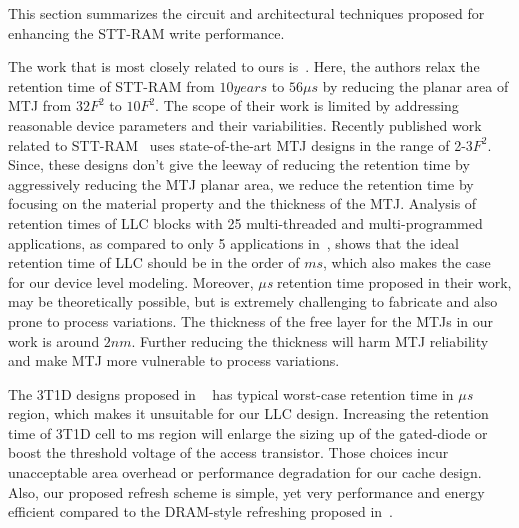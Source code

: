 


This section summarizes the circuit and architectural techniques proposed for enhancing the STT-RAM
write performance.

The work that is most closely related to ours is~\cite{STTRAM:HPCA11}.
Here, the authors relax the retention time of STT-RAM from $10 years$ to $56 \mu s$ by
reducing the planar area of MTJ from $32F^2$ to $10F^2$. The scope of their work is limited by
addressing reasonable device parameters and their variabilities. Recently published work related to
STT-RAM~\cite{PMTJ:Toshiba08,STTRAM:EDL11,STTRAM:Qualcomm09,STTRAM:Grandis11}
uses state-of-the-art MTJ designs in the range of 2-3$F^2$. Since, these designs don't give the
leeway of reducing the retention time by aggressively reducing the MTJ planar area, we reduce the
retention time by focusing on the material property and the thickness of the MTJ.
Analysis of
retention times of LLC blocks with 25 multi-threaded and multi-programmed applications,
as compared to only 5 applications in~\cite{STTRAM:HPCA11}, shows that
the ideal retention time of LLC should be in the order of $ms$, which also makes
the case for our device level modeling. Moreover, {\it $\mu$s} retention time proposed
in their work, may be theoretically possible, but is extremely challenging to
fabricate and also prone to process variations. The thickness of the free layer for the MTJs in our work is around $2nm$. Further reducing the thickness will harm MTJ reliability and make MTJ more vulnerable to process variations.


The 3T1D designs proposed in ~\cite{3T-brooks} has typical worst-case retention time in {\it $\mu$s} region, which makes it unsuitable for our LLC design. Increasing the retention time of 3T1D cell to ms region will enlarge the sizing up of the gated-diode or boost the threshold voltage of the access transistor. Those choices incur unacceptable area overhead or performance degradation for our cache design. Also, our proposed refresh scheme is simple, yet very performance and energy efficient compared to the DRAM-style refreshing proposed in~\cite{STTRAM:HPCA11}.

